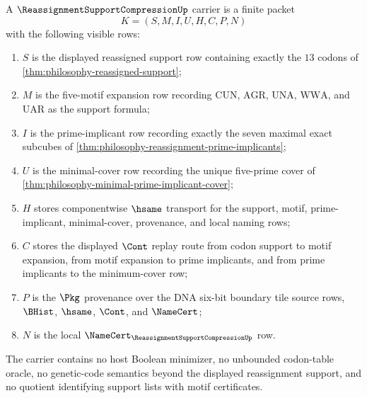 \begin{definition}
\label{def:reassignment-support-compression-carrier}
A $\ReassignmentSupportCompressionUp$ carrier is a finite packet
$$
K=(S,M,I,U,H,C,P,N)
$$
with the following visible rows:
\begin{enumerate}
\item $S$ is the displayed reassigned support row containing exactly the $13$ codons of \autoref{thm:philosophy-reassigned-support};
\item $M$ is the five-motif expansion row recording $\mathrm{CUN}$, $\mathrm{AGR}$, $\mathrm{UNA}$, $\mathrm{WWA}$, and $\mathrm{UAR}$ as the support formula;
\item $I$ is the prime-implicant row recording exactly the seven maximal exact subcubes of \autoref{thm:philosophy-reassignment-prime-implicants};
\item $U$ is the minimal-cover row recording the unique five-prime cover of \autoref{thm:philosophy-minimal-prime-implicant-cover};
\item $H$ stores componentwise $\hsame$ transport for the support, motif, prime-implicant, minimal-cover, provenance, and local naming rows;
\item $C$ stores the displayed $\Cont$ replay route from codon support to motif expansion, from motif expansion to prime implicants, and from prime implicants to the minimum-cover row;
\item $P$ is the $\Pkg$ provenance over the DNA six-bit boundary tile source rows, $\BHist$, $\hsame$, $\Cont$, and $\NameCert$;
\item $N$ is the local $\NameCert_{\ReassignmentSupportCompressionUp}$ row.
\end{enumerate}
The carrier contains no host Boolean minimizer, no unbounded codon-table oracle, no genetic-code semantics beyond the displayed reassignment support, and no quotient identifying support lists with motif certificates.
\end{definition}

